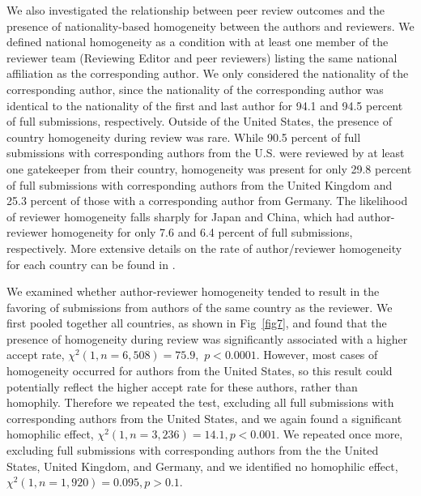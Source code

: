 \documentclass[10pt,letterpaper]{article}
\begin{document}
We also investigated the relationship between peer review outcomes and the presence of nationality-based homogeneity between the authors and reviewers. We defined national homogeneity as a condition with at least one member of the reviewer team (Reviewing Editor and peer reviewers) listing the same national affiliation as the corresponding author. We only considered the nationality of the corresponding author, since the nationality of the corresponding author was identical to the nationality of the first and last author for 94.1 and 94.5 percent of full submissions, respectively. Outside of the United States, the presence of country homogeneity during review was rare. While 90.5 percent of full submissions with corresponding authors from the U.S. were reviewed by at least one gatekeeper from their country, homogeneity was present for only 29.8 percent of full submissions with corresponding authors from the United Kingdom and 25.3 percent of those with a corresponding author from Germany. The likelihood of reviewer homogeneity falls sharply for Japan and China, which had author-reviewer homogeneity for only 7.6 and 6.4 percent of full submissions, respectively. More extensive details on the rate of author/reviewer homogeneity for each country can be found in . 

We examined whether author-reviewer homogeneity tended to result in the favoring of submissions from authors of the same country as the reviewer. We first pooled together all countries, as shown in Fig~\ref{fig7}, and found that the presence of homogeneity during review was significantly associated with a higher accept rate, $\chi^{2} (1, n = 6,508) = 75.9,$ $p < 0.0001$. However, most cases of homogeneity occurred for authors from the United States, so this result could potentially reflect the higher accept rate for these authors, rather than homophily. Therefore we repeated the test, excluding all full submissions with corresponding authors from the United States, and we again found a significant homophilic effect, $\chi^{2} (1, n = 3,236) = 14.1, p < 0.001$. We repeated once more, excluding full submissions with corresponding authors from the the United States, United Kingdom, and Germany, and we identified no homophilic effect, $\chi^{2} (1, n = 1,920) = 0.095, p > 0.1$. 
\end{document}
